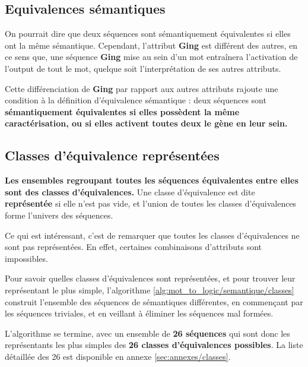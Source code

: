 \subsection{Equivalences sémantiques}
\label{subsec:mot_to_logic/semantique/equivalences}
\par
On pourrait dire que deux séquences sont sémantiquement équivalentes si elles ont la même sémantique. Cependant, l'attribut \textbf{Ging} est différent des autres, en ce sens que, une séquence \textbf{Ging} mise au sein d'un mot entraînera l'activation de l'output de tout le mot, quelque soit l'interprétation de ses autres attributs.\\
\par
Cette différenciation de \textbf{Ging} par rapport aux autres attributs rajoute une condition à la définition d'équivalence sémantique : deux séquences sont \textbf{sémantiquement équivalentes si elles possèdent la même caractérisation, ou si elles activent toutes deux le gène en leur sein.}


\subsection{Classes d'équivalence représentées}
\label{subsec:mot_to_logic/semantique/classes}
\par
\textbf{Les ensembles regroupant toutes les séquences équivalentes entre elles sont des classes d'équivalences.} Une classe d'équivalence est dite \textbf{représentée} si elle n'est pas vide, et l'union de toutes les classes d'équivalences forme l'univers des séquences.
\par
Ce qui est intéressant, c'est de remarquer que toutes les classes d'équivalences ne sont pas représentées. En effet, certaines combinaisons d'attributs sont impossibles.\\
\par
Pour savoir quelles classes d'équivalences sont représentées, et pour trouver leur représentant le plus simple, l'algorithme \ref{alg:mot_to_logic/semantique/classes} construit l'ensemble des séquences de sémantiques différentes, en commençant par les séquences triviales, et en veillant à éliminer les séquences mal formées.
\par
L'algorithme se termine, avec un ensemble de \textbf{26 séquences} qui sont donc les représentants les plus simples des \textbf{26 classes d'équivalences possibles}. La liste détaillée des 26 est disponible en annexe \ref{sec:annexes/classes}.\\

